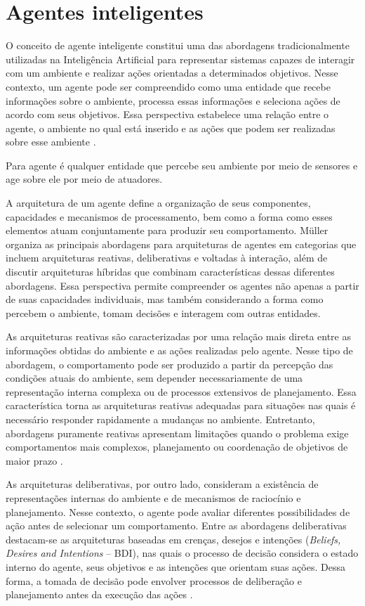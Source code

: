 \section{Agentes inteligentes}
\label{sec:agentes-inteligentes}

O conceito de agente inteligente constitui uma das abordagens
tradicionalmente utilizadas na Inteligência Artificial para representar
sistemas capazes de interagir com um ambiente e realizar ações orientadas
a determinados objetivos. Nesse contexto, um agente pode ser compreendido
como uma entidade que recebe informações sobre o ambiente, processa essas
informações e seleciona ações de acordo com seus objetivos. Essa perspectiva
estabelece uma relação entre o agente, o ambiente no qual está inserido e as
ações que podem ser realizadas sobre esse ambiente \cite{muller1999}.

Para  agente é qualquer entidade que percebe seu ambiente por meio de sensores e age sobre ele por meio de atuadores.

A arquitetura de um agente define a organização de seus componentes,
capacidades e mecanismos de processamento, bem como a forma como esses
elementos atuam conjuntamente para produzir seu comportamento. Müller
\cite{muller1999} organiza as principais abordagens para arquiteturas de
agentes em categorias que incluem arquiteturas reativas, deliberativas e
voltadas à interação, além de discutir arquiteturas híbridas que combinam
características dessas diferentes abordagens. Essa perspectiva permite
compreender os agentes não apenas a partir de suas capacidades individuais,
mas também considerando a forma como percebem o ambiente, tomam decisões e
interagem com outras entidades.

As arquiteturas reativas são caracterizadas por uma relação mais direta
entre as informações obtidas do ambiente e as ações realizadas pelo agente.
Nesse tipo de abordagem, o comportamento pode ser produzido a partir da
percepção das condições atuais do ambiente, sem depender necessariamente de
uma representação interna complexa ou de processos extensivos de
planejamento. Essa característica torna as arquiteturas reativas adequadas
para situações nas quais é necessário responder rapidamente a mudanças no
ambiente. Entretanto, abordagens puramente reativas apresentam limitações
quando o problema exige comportamentos mais complexos, planejamento ou
coordenação de objetivos de maior prazo \cite{muller1999}.

As arquiteturas deliberativas, por outro lado, consideram a existência de
representações internas do ambiente e de mecanismos de raciocínio e
planejamento. Nesse contexto, o agente pode avaliar diferentes possibilidades
de ação antes de selecionar um comportamento. Entre as abordagens
deliberativas destacam-se as arquiteturas baseadas em crenças, desejos e
intenções (\textit{Beliefs, Desires and Intentions} -- BDI), nas quais o
processo de decisão considera o estado interno do agente, seus objetivos e
as intenções que orientam suas ações. Dessa forma, a tomada de decisão pode
envolver processos de deliberação e planejamento antes da execução das ações
\cite{muller1999}.

